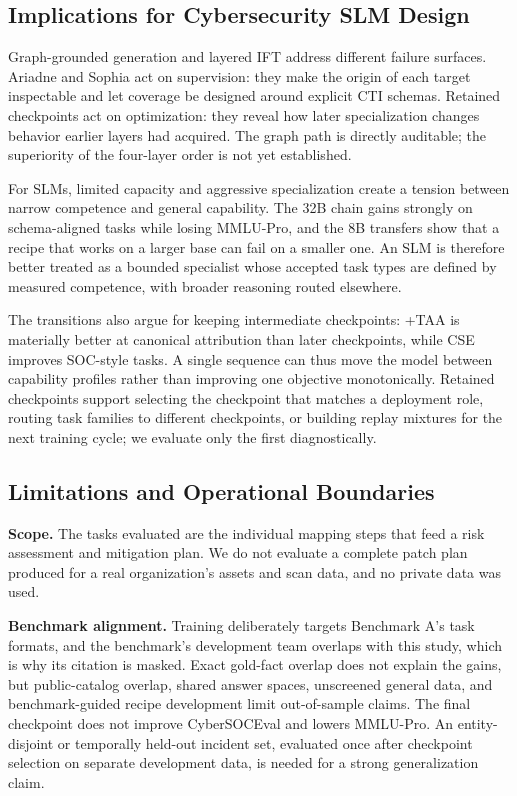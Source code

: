\documentclass[conference]{IEEEtran}
\begin{document}
\subsection{Implications for Cybersecurity SLM Design}
Graph-grounded generation and layered IFT address different failure surfaces. Ariadne and Sophia act on supervision: they make the origin of each target inspectable and let coverage be designed around explicit CTI schemas. Retained checkpoints act on optimization: they reveal how later specialization changes behavior earlier layers had acquired. The graph path is directly auditable; the superiority of the four-layer order is not yet established.

For SLMs, limited capacity and aggressive specialization create a tension between narrow competence and general capability. The 32B chain gains strongly on schema-aligned tasks while losing MMLU-Pro, and the 8B transfers show that a recipe that works on a larger base can fail on a smaller one. An SLM is therefore better treated as a bounded specialist whose accepted task types are defined by measured competence, with broader reasoning routed elsewhere.

The transitions also argue for keeping intermediate checkpoints: +TAA is materially better at canonical attribution than later checkpoints, while CSE improves SOC-style tasks. A single sequence can thus move the model between capability profiles rather than improving one objective monotonically. Retained checkpoints support selecting the checkpoint that matches a deployment role, routing task families to different checkpoints, or building replay mixtures for the next training cycle; we evaluate only the first diagnostically.

\subsection{Limitations and Operational Boundaries}\label{sec:limits}
\textbf{Scope.} The tasks evaluated are the individual mapping steps that feed a risk assessment and mitigation plan. We do not evaluate a complete patch plan produced for a real organization's assets and scan data, and no private data was used.

\textbf{Benchmark alignment.} Training deliberately targets Benchmark A's task formats, and the benchmark's development team overlaps with this study, which is why its citation is masked. Exact gold-fact overlap does not explain the gains, but public-catalog overlap, shared answer spaces, unscreened general data, and benchmark-guided recipe development limit out-of-sample claims. The final checkpoint does not improve CyberSOCEval and lowers MMLU-Pro. An entity-disjoint or temporally held-out incident set, evaluated once after checkpoint selection on separate development data, is needed for a strong generalization claim.
\end{document}
